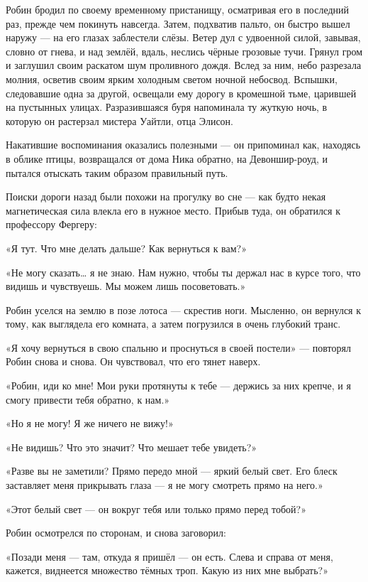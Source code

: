 \documentclass[a5paper, 9pt,
final, openany, twoside=true]{memoir}
\begin{document}
Робин бродил по своему временному пристанищу, осматривая его в последний раз, прежде чем покинуть навсегда. Затем, подхватив пальто, он быстро вышел наружу — на его глазах заблестели слёзы. Ветер дул с удвоенной силой, завывая, словно от гнева, и над землёй, вдаль, неслись чёрные грозовые тучи. Грянул гром и заглушил своим раскатом шум проливного дождя. Вслед за ним, небо разрезала молния, осветив своим ярким холодным светом ночной небосвод. Вспышки, следовавшие одна за другой, освещали ему дорогу в кромешной тьме, царившей на пустынных улицах. Разразившаяся буря напоминала ту жуткую ночь, в которую он растерзал мистера Уайтли, отца Элисон.

Накатившие воспоминания оказались полезными — он припоминал как, находясь в облике птицы, возвращался от дома Ника обратно, на Девоншир-роуд, и пытался отыскать таким образом правильный путь.

Поиски дороги назад были похожи на прогулку во сне — как будто некая магнетическая сила влекла его в нужное место. Прибыв туда, он обратился к профессору Фергеру:

«Я тут. Что мне делать дальше? Как вернуться к вам?»

«Не могу сказать… я не знаю. Нам нужно, чтобы ты держал нас в курсе того, что видишь и чувствуешь. Мы можем лишь посоветовать.»

Робин уселся на землю в позе лотоса — скрестив ноги. Мысленно, он вернулся к тому, как выглядела его комната, а затем погрузился в очень глубокий транс.

«Я хочу вернуться в свою спальню и проснуться в своей постели» — повторял Робин снова и снова. Он чувствовал, что его тянет наверх.

«Робин, иди ко мне! Мои руки протянуты к тебе — держись за них крепче, и я смогу привести тебя обратно, к нам.»

«Но я не могу! Я же ничего не вижу!»

«Не видишь? Что это значит? Что мешает тебе увидеть?»

«Разве вы не заметили? Прямо передо мной — яркий белый свет. Его блеск заставляет меня прикрывать глаза — я не могу смотреть прямо на него.»

«Этот белый свет — он вокруг тебя или только прямо перед тобой?»

Робин осмотрелся по сторонам, и снова заговорил:

«Позади меня — там, откуда я пришёл — он есть. Слева и справа от меня, кажется, виднеется множество тёмных троп. Какую из них мне выбрать?»
\end{document}

